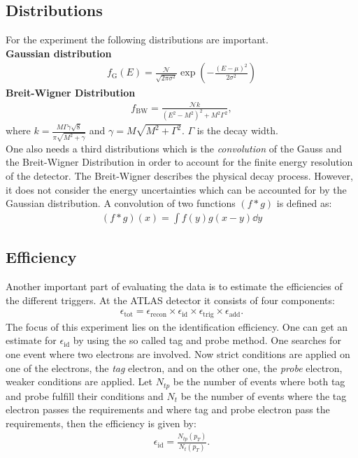 \documentclass[12pt, a4paper, bibliography=totoc]{scrartcl}
\begin{document}
\begin{multicols}{2}
\subsection{Distributions}
For the experiment the following distributions are important.\\
\textbf{Gaussian distribution}
\begin{align}
    f_{\text{G}} (E) = \frac{\mathcal{N}}{\sqrt{2 \pi \sigma^2}} \exp \left( - \frac{(E - \mu )^2}{2 \sigma^2} \right)
\end{align}
\textbf{Breit-Wigner Distribution}
\begin{align}
    f_{\text{BW}} = \frac{\mathcal{N} k}{(E^2 - M^2)^2 + M^2 \Gamma^2} ,
\end{align}
where $k = \frac{M\Gamma \gamma \sqrt{8}}{\pi \sqrt{M^2 + \gamma}}$ and $\gamma = M \sqrt{M^2 + \Gamma^2}$. $\Gamma$ is the decay width.\\
One also needs a third distributions which is the \textit{convolution} of the Gauss and the Breit-Wigner Distribution in order to account for the finite energy resolution of the detector. 
The Breit-Wigner describes the physical decay process. 
However, it does not consider the energy uncertainties which can be accounted for by the Gaussian distribution.
A convolution of two functions $(f \ast g)$ is defined as:
\begin{align}
    (f \ast g) (x) = \int f(y)g(x-y)\dd y
\end{align}

\subsection{Efficiency}
Another important part of evaluating the data is to estimate the efficiencies of the different triggers.
At the ATLAS detector it consists of four components:
\begin{align}
     \epsilon_{\text{tot}} =  \epsilon_{\text{recon}} \times \epsilon_{\text{id}} \times \epsilon_{\text{trig}} \times \epsilon_{\text{add}}  .
\end{align}
The focus of this experiment lies on the identification efficiency.
One can get an estimate for $\epsilon_{\text{id}}$ by using the so called tag and probe method.
One searches for one event where two electrons are involved. 
Now strict conditions are applied on one of the electrons, the \textit{tag} electron, 
and on the other one, the \textit{probe} electron, weaker conditions are applied.
Let $N_{tp}$ be the number of events where both tag and probe fulfill their conditions and $N_t$ be the number of events where the tag electron passes the requirements and where tag and probe electron pass the requirements, then the efficiency is given by:
\begin{align}
    \epsilon_{\text{id}} = \frac{N_{tp} (p_T)}{N_t(p_T)}.
\end{align}



\end{multicols}
\end{document}
